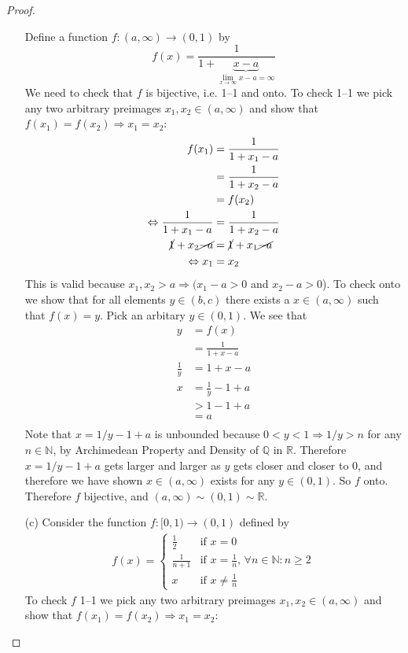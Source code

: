 \documentclass[11pt,twoside, reqno]{amsart}
\theoremstyle{remark}
\def\R{\mathbb R}
\def\Q{\mathbb Q}
\def\N{\mathbb N}
\renewcommand{\implies}{\Rightarrow}
\renewcommand{\iff}{\Leftrightarrow}
\begin{document}
\begin{proof}
\begin{enumerate}
Define a function $f:(a,\infty) \to (0,1)$ by
$$
f(x) = \frac{1}{1+\underbrace{x-a}_{\lim_{x \to \infty}x-a = \infty}}
$$
We need to check that $f$ is bijective, i.e. 1--1 and onto. To check 1--1 we pick any two arbitrary preimages $x_1, x_2 \in (a,\infty)$ and show that $f(x_1) = f(x_2) \implies x_1 = x_2$:
\begin{align*}
    f(x_1) &= \frac{1}{1 + x_1 - a} \\
    &= \frac{1}{1 + x_2 - a} \\
    &= f(x_2) \\
    \iff \frac{1}{1 + x_1 - a} &= \frac{1}{1 + x_2 - a}\\
    \cancel{1} + x_2 \cancel{- a} &= \cancel{1} + x_1 \cancel{- a} \\
    \iff x_1 &= x_2
\end{align*}
This is valid because $x_1,x_2 > a \implies (x_1 - a > 0$ and $x_2 - a > 0$).
To check onto we show that for all elements $y \in (b, c)$ there exists a $x \in (a,\infty)$ such that $f(x) = y$. Pick an arbitary $y \in (0,1)$. We see that
\begin{align*}
    y &= f(x)\\
    &=\frac{1}{1 + x - a}\\
    \frac{1}{y} & = 1 + x - a\\
    x &= \frac{1}{y} -1 + a\\
    &> 1 -1 + a\\
    &= a\\
\end{align*}
Note that $x = 1/y - 1 + a$ is unbounded because $0 < y < 1 \implies 1/y > n$ for any $n \in \N$, by Archimedean Property and Density of $\Q$ in $\R$. Therefore $x = 1/y - 1 + a$ gets larger and larger as $y$ gets closer and closer to $0$, and therefore we have shown $x \in (a,\infty)$ exists for any $y \in (0,1)$. So $f$ onto. Therefore $f$ bijective, and $(a,\infty) \sim (0,1) \sim \R$.
\item[(c)] Consider the function $f:[0,1) \to (0,1)$ defined by
\begin{align*}
    f(x) = 
    \begin{cases}
        \frac{1}{2} & \text{if $x = 0$}\\
        \frac{1}{n+1} & \text{if $x = \frac{1}{n}$, $\forall n \in \N : n \geq 2$}\\
        x & \text{if $x \neq \frac{1}{n}$}
    \end{cases}
\end{align*}
To check $f$ 1--1 we pick any two arbitrary preimages $x_1, x_2 \in (a,\infty)$ and show that $f(x_1) = f(x_2) \implies x_1 = x_2$:

\end{enumerate}
\end{proof}
\end{document}
